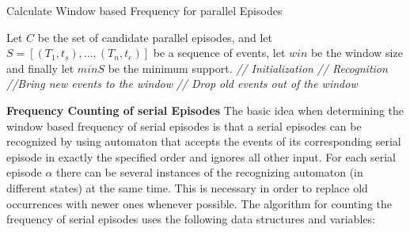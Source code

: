 \begin{algorithm}[H]
  \caption{Calculate Window based Frequency for parallel Episodes
    \label{alg_windowBasedParallel}}
  \begin{algorithmic}[1]
    \Statex
    \Require Let $C$ be the set of candidate parallel episodes, and let $S=[(T_1,t_s),...,(T_n,t_e)]$ be a sequence of events, let $win$ be the window size and finally let $minS$ be the minimum support.
      \State \textit{// Initialization}
      		\EndFor
      	\EndFor
      \EndFor
      	\EndFor
      \EndFor
      \State \textit{// Recognition}
      	\State \textit{//Bring new events to the window}
       			\EndIf
      		\EndFor
 		\EndFor
 		\State \textit{// Drop old events out of the window}
       			\EndIf
 			\EndFor
 		\EndFor
      \EndFor
      \State {}
  \end{algorithmic}
\end{algorithm}

\textbf{Frequency Counting of serial Episodes} \newline
The basic idea when determining the window based frequency of serial episodes is that a serial episodes can be recognized by using automaton that accepts the events of its corresponding serial episode in exactly the specified order and ignores all other input. For each serial episode $\alpha$ there can be several instances of the recognizing automaton (in different states) at the same time. This is necessary in order to replace old occurrences with newer ones whenever possible. The algorithm for counting the frequency of serial episodes uses the following data structures and variables: %

